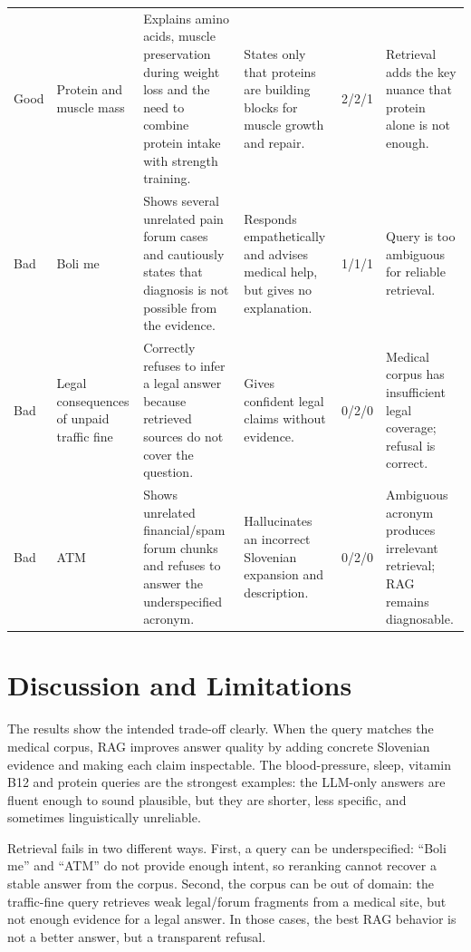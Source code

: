 \documentclass[9pt]{IEEEtran}
\begin{document}
\begin{table}[t]
\begin{tabular}{p{1.3cm}p{3.0cm}p{4.4cm}p{3.9cm}p{1.4cm}p{2.3cm}}
Good & Protein and muscle mass &
Explains amino acids, muscle preservation during weight loss and the need to
combine protein intake with strength training. &
States only that proteins are building blocks for muscle growth and repair. &
2/2/1 & Retrieval adds the key nuance that protein alone is not enough. \\

Bad & Boli me &
Shows several unrelated pain forum cases and cautiously states that diagnosis
is not possible from the evidence. &
Responds empathetically and advises medical help, but gives no explanation. &
1/1/1 & Query is too ambiguous for reliable retrieval. \\

Bad & Legal consequences of unpaid traffic fine &
Correctly refuses to infer a legal answer because retrieved sources do not
cover the question. &
Gives confident legal claims without evidence. &
0/2/0 & Medical corpus has insufficient legal coverage; refusal is correct. \\

Bad & ATM &
Shows unrelated financial/spam forum chunks and refuses to answer the
underspecified acronym. &
Hallucinates an incorrect Slovenian expansion and description. &
0/2/0 & Ambiguous acronym produces irrelevant retrieval; RAG remains
diagnosable. \\
\bottomrule
\end{tabular}
\end{table}

\section{Discussion and Limitations}
The results show the intended trade-off clearly.  When the query matches the
medical corpus, RAG improves answer quality by adding concrete Slovenian
evidence and making each claim inspectable.  The blood-pressure, sleep,
vitamin B12 and protein queries are the strongest examples: the LLM-only
answers are fluent enough to sound plausible, but they are shorter, less
specific, and sometimes linguistically unreliable.

Retrieval fails in two different ways.  First, a query can be underspecified:
``Boli me'' and ``ATM'' do not provide enough intent, so reranking cannot
recover a stable answer from the corpus.  Second, the corpus can be out of
domain: the traffic-fine query retrieves weak legal/forum fragments from a
medical site, but not enough evidence for a legal answer.  In those cases, the
best RAG behavior is not a better answer, but a transparent refusal.
\end{document}
